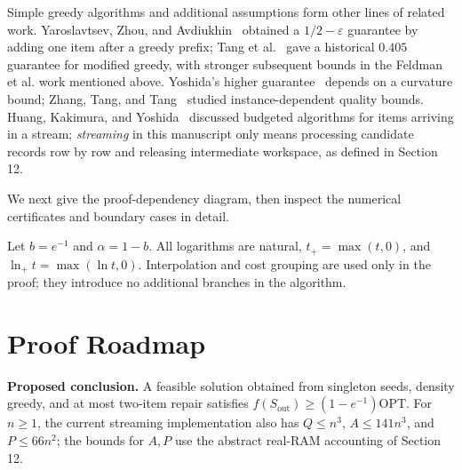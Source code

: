\documentclass[11pt,a4paper]{article}
\begin{document}
Simple greedy algorithms and additional assumptions form other lines of related work.
Yaroslavtsev, Zhou, and Avdiukhin~\cite{yaroslavtsev2020} obtained a
$1/2-\varepsilon$ guarantee by adding one item after a greedy prefix; Tang et al.~\cite{tang2021modified} gave a
historical $0.405$ guarantee for modified greedy, with stronger subsequent bounds in the Feldman et al. work mentioned above.
Yoshida's higher guarantee~\cite{yoshida2019curvature} depends on a curvature bound;
Zhang, Tang, and Tang~\cite{zhang2026datadependent} studied instance-dependent quality bounds.
Huang, Kakimura, and Yoshida~\cite{huang2017streaming} discussed budgeted algorithms for items arriving in a stream;
\emph{streaming} in this manuscript only means processing candidate records row by row and releasing intermediate workspace, as defined in Section 12.

We next give the proof-dependency diagram, then inspect the numerical certificates and boundary cases in detail.

Let $b=e^{-1}$ and $\alpha=1-b$. All logarithms are natural, $t_+=\max(t,0)$, and $\ln_+t=\max(\ln t,0)$. Interpolation and cost grouping are used only in the proof; they introduce no additional branches in the algorithm.

\section*{Proof Roadmap}
\noindent\textbf{Proposed conclusion.} A feasible solution obtained from singleton seeds, density greedy, and at most two-item repair satisfies
$f(S_{\mathrm{out}})\ge(1-e^{-1})\mathrm{OPT}$. For $n\ge1$, the current streaming implementation also has
$Q\le n^3$, $A\le141n^3$, and $P\le66n^2$; the bounds for $A,P$ use the abstract real-RAM accounting of Section 12.
\end{document}
